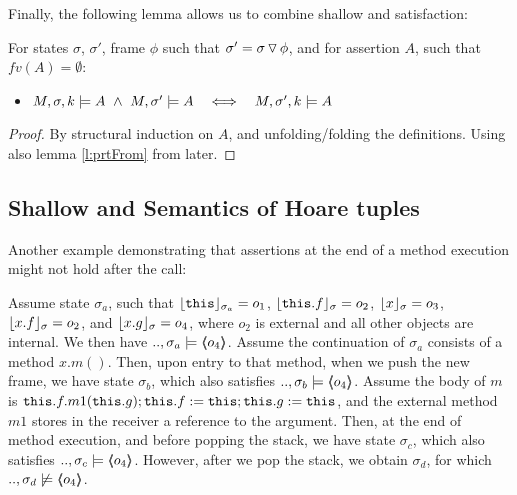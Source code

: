  
 
Finally, the following lemma allows us to combine shallow and \Strong satisfaction:

\begin{lemma}
\label{l:shallow:scoped:scoped}
For states  $\sigma$,  $\sigma'$, frame $\phi$ such that $\sigma'=\sigma  \pushSymbol \phi$, and for  
assertion $A$, such that $fv(A)=\emptyset$:
\begin{itemize}
\item
$\satDAssertFrom M  \sigma k A\   \wedge \ M, \sigma' \models A \ \ \ \Longleftrightarrow \ \ \   \satDAssertFrom M  {\sigma'} k  A$ 
\end{itemize}
\end{lemma}

\begin{proof}
By structural induction on $A$, and unfolding/folding the definitions. Using also lemma \ref{l:prtFrom} from later.
\end{proof}




\subsection{Shallow and \Strong Semantics of Hoare tuples}
\label{s:shallow:deep:appendix}
Another example demonstrating that assertions at the end of a method execution might not hold after the call:

\begin{example}
\label{ex:motivate:scopes}
Assume state $\sigma_a$, such that $\interpret {\sigma_a} {\prg{this}}=o_1$, $\interpret {\sigma} {\prg{this}.f}=o_2$, $\interpret {\sigma} {x}=o_3$, $\interpret {\sigma} {x.f}=o_2$,  
and $\interpret {\sigma} {x.g}=o_4$, where $o_2$ is external and all other objects are internal. 
We then have $..,\sigma_a \models  \inside {o_4}$.
Assume %
 the continuation of $\sigma_a$   consists of a method $x.m()$. Then,
upon entry to that method, when we push the new frame, we have  state $\sigma_b$, which also satisfies $..,\sigma_b \models  \inside {o_4}$.
Assume %
 the   body of $m$ is $\prg{this}.f.m1(\prg{this}.g); \prg{this}.f := \prg{this};  \prg{this}.g := \prg{this}$, and %
 the external method $m1$ stores in the 
receiver a reference to the argument.
Then, at the end of method execution, and before popping the stack, we have   state $\sigma_c$, which also satisfies $..,\sigma_c \models  \inside {o_4}$.
However, after we pop the stack, we obtain $\sigma_d$, for which $..,\sigma_d \not\models  \inside {o_4}$.
\end{example} 


